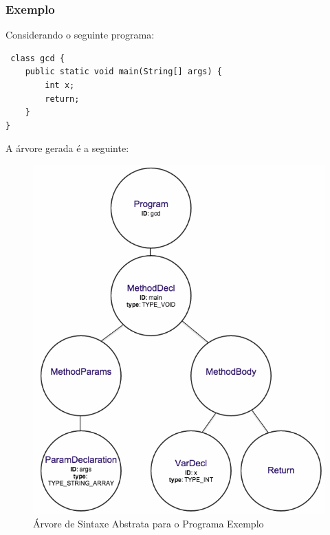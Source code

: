 \documentclass[12pt]{article}
\begin{document}
\subsubsection{Exemplo}
Considerando o seguinte programa:


\begin{lstlisting}
 class gcd {
 	public static void main(String[] args) {
    	int x;
    	return;
	} 		
}
\end{lstlisting}

A árvore gerada é a seguinte:

\begin{figure}[H]
       \centering
       \includegraphics[keepaspectratio=true, scale = 0.5]{arvore.png}
       \caption{Árvore de Sintaxe Abstrata para o Programa Exemplo}
\end{figure}

 
\end{document}
